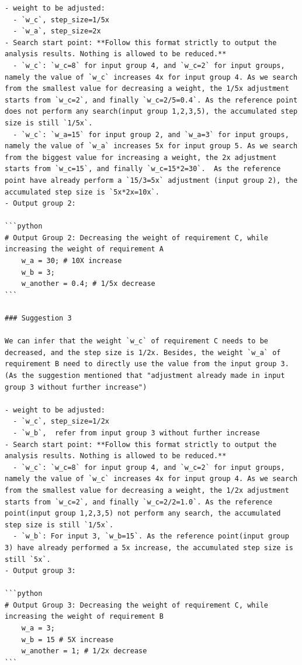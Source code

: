\documentclass{article}
\begin{document}
\begin{verbatim}
- weight to be adjusted:
  - `w_c`, step_size=1/5x
  - `w_a`, step_size=2x
- Search start point: **Follow this format strictly to output the analysis results. Nothing is allowed to be reduced.**
  - `w_c`: `w_c=8` for input group 4, and `w_c=2` for input groups, namely the value of `w_c` increases 4x for input group 4. As we search from the smallest value for decreasing a weight, the 1/5x adjustment starts from `w_c=2`, and finally `w_c=2/5=0.4`. As the reference point does not perform any search(input group 1,2,3,5), the accumulated step size is still `1/5x`.
  - `w_c`: `w_a=15` for input group 2, and `w_a=3` for input groups, namely the value of `w_a` increases 5x for input group 5. As we search from the biggest value for increasing a weight, the 2x adjustment starts from `w_c=15`, and finally `w_c=15*2=30`.  As the reference point have already perform a `15/3=5x` adjustment (input group 2), the accumulated step size is `5x*2x=10x`.
- Output group 2:

```python
# Output Group 2: Decreasing the weight of requirement C, while increasing the weight of requirement A
	w_a = 30; # 10X increase
    w_b = 3;
    w_another = 0.4; # 1/5x decrease
```

### Suggestion 3

We can infer that the weight `w_c` of requirement C needs to be decreased, and the step size is 1/2x. Besides, the weight `w_a` of requirement B need to directly use the value from the input group 3. (As the suggestion mentioned that "adjustment already made in input group 3 without further increase")

- weight to be adjusted:
  - `w_c`, step_size=1/2x
  - `w_b`,  refer from input group 3 without further increase
- Search start point: **Follow this format strictly to output the analysis results. Nothing is allowed to be reduced.**
  - `w_c`: `w_c=8` for input group 4, and `w_c=2` for input groups, namely the value of `w_c` increases 4x for input group 4. As we search from the smallest value for decreasing a weight, the 1/2x adjustment starts from `w_c=2`, and finally `w_c=2/2=1.0`. As the reference point(input group 1,2,3,5) not perform any search, the accumulated step size is still `1/5x`.
  - `w_b`: For input 3, `w_b=15`. As the reference point(input group 3) have already performed a 5x increase, the accumulated step size is still `5x`.
- Output group 3:

```python
# Output Group 3: Decreasing the weight of requirement C, while increasing the weight of requirement B
	w_a = 3; 
    w_b = 15 # 5X increase
    w_another = 1; # 1/2x decrease
```

\end{verbatim}
\end{document}
